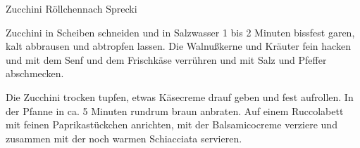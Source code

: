 \begin{recipe}{Zucchini Röllchen}{nach Sprecki}
  \label{Zucchiniroellchen}
  \inglist

  \steps

  Zucchini in Scheiben schneiden und in Salzwasser 1 bis 2 Minuten bissfest
  garen, kalt abbrausen und abtropfen lassen. Die Walnußkerne und Kräuter fein
  hacken und mit dem Senf und dem Frischkäse verrühren und mit Salz und Pfeffer
  abschmecken.

  Die Zucchini trocken tupfen, etwas Käsecreme drauf geben und fest
  aufrollen. In der Pfanne in ca. 5 Minuten rundrum braun anbraten. Auf einem
  Ruccolabett mit feinen Paprikastückchen anrichten, mit der Balsamicocreme
  verziere und zusammen mit der noch warmen Schiacciata servieren.
\end{recipe}
